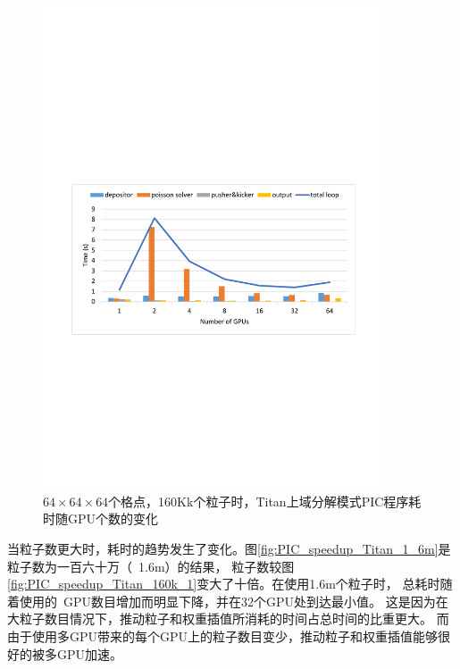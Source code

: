 \begin{figure}[!htb]
  \centering
  \includegraphics[width=0.9\textwidth]{Img/PIC_speedup_Titan_160k_2.pdf}
  \caption{$64 \times 64 \times 64$个格点，160Kk个粒子时，Titan上域分解模式PIC程序耗时随GPU个数的变化}
  \label{fig:PIC_speedup_Titan_160k_2}
\end{figure}

当粒子数更大时，耗时的趋势发生了变化。图\ref{fig:PIC_speedup_Titan_1_6m}是粒子数为一百六十万（~1.6m）的结果，
粒子数较图\ref{fig:PIC_speedup_Titan_160k_1}变大了十倍。在使用1.6m个粒子时，
总耗时随着使用的~GPU数目增加而明显下降，并在32个GPU处到达最小值。
这是因为在大粒子数目情况下，推动粒子和权重插值所消耗的时间占总时间的比重更大。
而由于使用多GPU带来的每个GPU上的粒子数目变少，推动粒子和权重插值能够很好的被多GPU加速。


